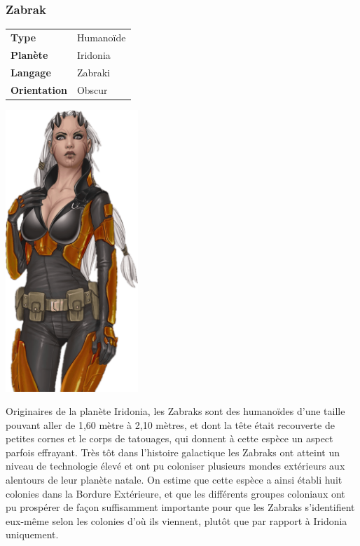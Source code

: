 \subsubsection{Zabrak}
\begin{samepage}
	\begin{flushright}
		\begin{tabular}{ l l }
			\textbf{Type} 			& Humanoïde \\
		   	\textbf{Planète} 		& Iridonia \\
		   	\textbf{Langage} 		& Zabraki \\
		   	\textbf{Orientation} 	& Obscur \\
		\end{tabular}
	\end{flushright}
	\vspace{-6\baselineskip}
	\includegraphics[width=5cm]{img/personnages/races/zabrak.png}
\end{samepage}

Originaires de la planète Iridonia, les Zabraks sont des humanoïdes d’une taille pouvant aller de 1,60 mètre à 2,10 mètres, et dont la tête était recouverte de petites cornes et le corps de tatouages, qui donnent à cette espèce un aspect parfois effrayant. Très tôt dans l’histoire galactique les Zabraks ont atteint un niveau de technologie élevé et ont pu coloniser plusieurs mondes extérieurs aux alentours de leur planète natale. On estime que cette espèce a ainsi établi huit colonies dans la Bordure Extérieure, et que les différents groupes coloniaux ont pu prospérer de façon suffisamment importante pour que les Zabraks s’identifient eux-même selon les colonies d’où ils viennent, plutôt que par rapport à Iridonia uniquement.

